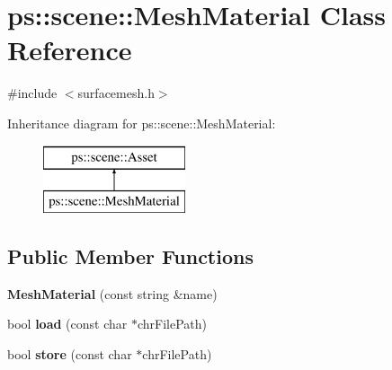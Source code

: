 \hypertarget{classps_1_1scene_1_1MeshMaterial}{}\section{ps\+:\+:scene\+:\+:Mesh\+Material Class Reference}
\label{classps_1_1scene_1_1MeshMaterial}


{\ttfamily \#include $<$surfacemesh.\+h$>$}

Inheritance diagram for ps\+:\+:scene\+:\+:Mesh\+Material\+:\begin{figure}[H]
\begin{center}
\leavevmode
\includegraphics[height=2.000000cm]{classps_1_1scene_1_1MeshMaterial}
\end{center}
\end{figure}
\subsection*{Public Member Functions}
\begin{DoxyCompactItemize}
\item 
\hypertarget{classps_1_1scene_1_1MeshMaterial_a3d7c3aebc91885aa712ec612ed30b090}{}{\bfseries Mesh\+Material} (const string \&name)\label{classps_1_1scene_1_1MeshMaterial_a3d7c3aebc91885aa712ec612ed30b090}

\item 
\hypertarget{classps_1_1scene_1_1MeshMaterial_ab0b2b5fa06a02b936e5797cf4a0ad7ed}{}bool {\bfseries load} (const char $\ast$chr\+File\+Path)\label{classps_1_1scene_1_1MeshMaterial_ab0b2b5fa06a02b936e5797cf4a0ad7ed}

\item 
\hypertarget{classps_1_1scene_1_1MeshMaterial_a54c47d41769a5bcd4b4f356345c06598}{}bool {\bfseries store} (const char $\ast$chr\+File\+Path)\label{classps_1_1scene_1_1MeshMaterial_a54c47d41769a5bcd4b4f356345c06598}

\end{DoxyCompactItemize}
